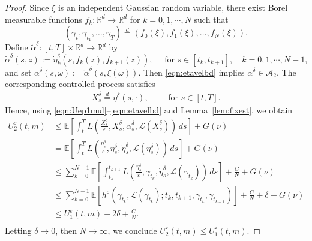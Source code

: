 \documentclass[reqno,11pt]{amsart}
\numberwithin{equation}{section}
\newcommand{\e}{\varepsilon}
\newcommand{\ep}{\varepsilon}
\begin{document}
\begin{proof}



Since $\xi$ is an independent Gaussian random variable, there exist Borel measurable functions $f_k:\mathbb{R}^d \to \mathbb{R}^d$ for $k=0,1,\cdots, N$ such that
\begin{equation}\label{eqn:coupling_gamma}
\left(\gamma_t, \gamma_{t_1}, \ldots, \gamma_{T}\right)\stackrel{d}{=}\left(f_0(\xi), f_1(\xi), \ldots, f_N(\xi)\right).
\end{equation}
 Define $\tilde{\alpha}^\delta:[t,T] \times \mathbb{R}^d \to \mathbb{R}^d$ by
\[
\tilde{\alpha}^\delta(s,z):=\dot{\eta}^\delta_k(s,f_k(z),f_{k+1}(z)), \quad \text{ for } s \in [t_k, t_{k+1}],\quad k=0,1, \cdots, N-1,
\]
and set $\alpha^\delta(s,\omega):=\tilde{\alpha}^\delta(s,\xi(\omega))$. Then \eqref{eqn:etavelbd} implies $\alpha^\delta\in\mathcal{A}_2$. The corresponding controlled process satisfies
\[
\begin{aligned}
X_s^\delta\stackrel{d}{=}\eta^\delta(s,\cdot), \qquad \text{ for } s \in[t, T].
\end{aligned}
\]
Hence, using \eqref{eqn:Uep1mul}–\eqref{eqn:etavelbd} and Lemma~\ref{lem:fixest}, we obtain
\[
\begin{aligned}
U^\e_2(t,m) &\leq \mathbb{E}\left[\int_t^TL\left(\frac{X_s^\delta}{\ep}, X_s^\delta,\alpha_s^\delta,\mathcal{L}(X_s^\delta)\right)\, ds\right]+G(\nu)\\
&=\mathbb E\left[ \int_t^T L\left( \frac{\eta^\delta_s}{\varepsilon}, \eta^\delta_s, \dot\eta^\delta_s, \mathcal L(\eta^\delta_s) \right)\,ds \right]+G(\nu)
\\&\le \sum_{k=0}^{N-1} \mathbb E\left[ \int_{t_k}^{t_{k+1}} L\left(\frac{\eta^\delta_s}{\varepsilon}, \gamma_{t_k}, \dot\eta^\delta_s, \mathcal{L}(\gamma_{t_k}) \right)\,ds \right] +\frac{C}{N}+G(\nu)
\\
&\leq \sum_{k=0}^{N-1}\mathbb{E} \left[h^\e \left(\gamma_{t_k},\mathcal{L}(\gamma_{t_k});t_k, t_{k+1}, \gamma_{t_k}, \gamma_{t_{k+1}}\right)\right]+\frac{C}{N}+\delta+G(\nu)\\
&\leq U_1^\ep(t,m)+2\delta+\frac{C}{N}.\\
\end{aligned}\]
Letting $\delta\to 0$, then $N\to\infty$, we conclude $U_2^\ep(t,m) \leq U_1^\ep(t,m)$.
\end{proof}
\end{document}
